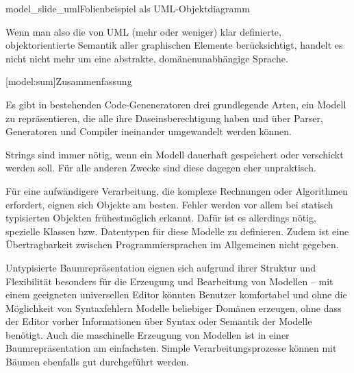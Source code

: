 \documentclass[12pt, a4paper, bibgerm]{scrbook}
\newcommand\lsection{}
\newcommand\fig{}
\begin{document}
\fig{model_slide_uml}{Folienbeispiel als UML-Objektdiagramm}

Wenn man also die von UML (mehr oder weniger) klar definierte,
objektorientierte Semantik aller graphischen Elemente berücksichtigt,
handelt es nicht nicht mehr um eine abstrakte, domänenunabhängige
Sprache.

\lsection[model:sum]{Zusammenfassung}

Es gibt in bestehenden Code-Geneneratoren drei grundlegende Arten, ein
Modell zu repräsentieren, die alle ihre Daseinsberechtigung haben und
über Parser, Generatoren und Compiler ineinander umgewandelt werden
können.

Strings sind immer nötig, wenn ein Modell dauerhaft gespeichert oder
verschickt werden soll. Für alle anderen Zwecke sind diese dagegen eher
unpraktisch.

Für eine aufwändigere Verarbeitung, die komplexe Rechnungen oder
Algorithmen erfordert, eignen sich Objekte am besten. Fehler werden vor
allem bei statisch typisierten Objekten frühestmöglich erkannt. Dafür
ist es allerdings nötig, spezielle Klassen bzw. Datentypen für diese
Modelle zu definieren. Zudem ist eine Übertragbarkeit zwischen
Programmiersprachen im Allgemeinen nicht gegeben.

Untypisierte Baumrepräsentation eignen sich aufgrund ihrer Struktur und
Flexibilität besonders für die Erzeugung und Bearbeitung von Modellen --
mit einem geeigneten universellen Editor könnten Benutzer komfortabel
und ohne die Möglichkeit von Syntaxfehlern Modelle beliebiger Domänen
erzeugen, ohne dass der Editor vorher Informationen über Syntax oder
Semantik der Modelle benötigt. Auch die maschinelle Erzeugung von
Modellen ist in einer Baumrepräsentation am einfachsten. Simple
Verarbeitungsprozesse können mit Bäumen ebenfalls gut durchgeführt
werden.
\end{document}
